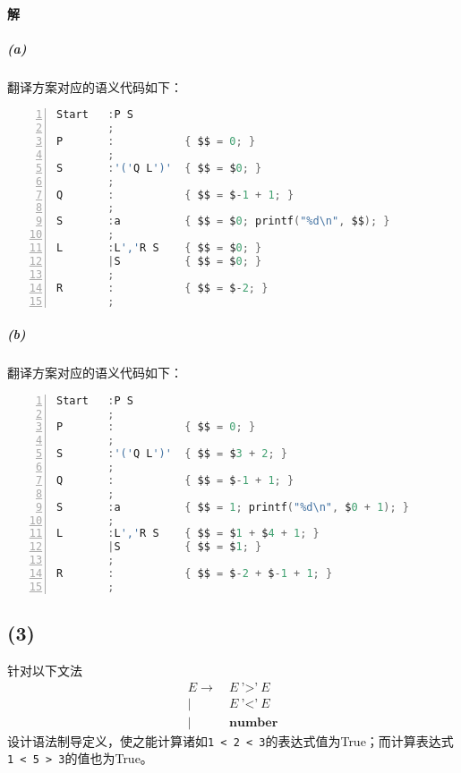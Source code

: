 \documentclass{article}
\begin{document}
\paragraph{解}
\subparagraph{(a)}
翻译方案对应的语义代码如下：
\begin{lstlisting}[language = C,
    numbers=left,
    numberstyle=\small,
    keywordstyle=\bfseries\color{blue!70},
    commentstyle=\color{red!40!green!60!blue},
    frame=shadowbox,
    rulesepcolor=\color{red!20!green!30!blue!20},
    basicstyle=\ttfamily,
    breaklines,
    columns = fixed,
    escapeinside=``]
Start   :P S
        ;
P       :           { $$ = 0; }
        ;
S       :'('Q L')'  { $$ = $0; }
        ;
Q       :           { $$ = $-1 + 1; }
        ;
S       :a          { $$ = $0; printf("%d\n", $$); }
        ;
L       :L','R S    { $$ = $0; }
        |S          { $$ = $0; }
        ;
R       :           { $$ = $-2; }
        ;
\end{lstlisting}
\subparagraph{(b)}
翻译方案对应的语义代码如下：
\begin{lstlisting}[language = C,
    numbers=left,
    numberstyle=\small,
    keywordstyle=\bfseries\color{blue!70},
    commentstyle=\color{red!40!green!60!blue},
    frame=shadowbox,
    rulesepcolor=\color{red!20!green!30!blue!20},
    basicstyle=\ttfamily,
    breaklines,
    columns = fixed,
    escapeinside=``]
Start   :P S
        ;
P       :           { $$ = 0; }
        ;
S       :'('Q L')'  { $$ = $3 + 2; }
        ;
Q       :           { $$ = $-1 + 1; }
        ;
S       :a          { $$ = 1; printf("%d\n", $0 + 1); }
        ;
L       :L','R S    { $$ = $1 + $4 + 1; }
        |S          { $$ = $1; }
        ;
R       :           { $$ = $-2 + $-1 + 1; }
        ;
\end{lstlisting}
\subsection*{(3)}
针对以下文法
\begin{align*}
    E \rightarrow &\ E\ \texttt{'>'}\ E \\
    |&\  E\ \texttt{'<'}\ E \\
    |&\  \textbf{number}
\end{align*}
设计语法制导定义，使之能计算诸如\texttt{1 < 2 < 3}的表达式值为True；而计算表达式\texttt{1 < 5 > 3}的值也为True。
\end{document}
